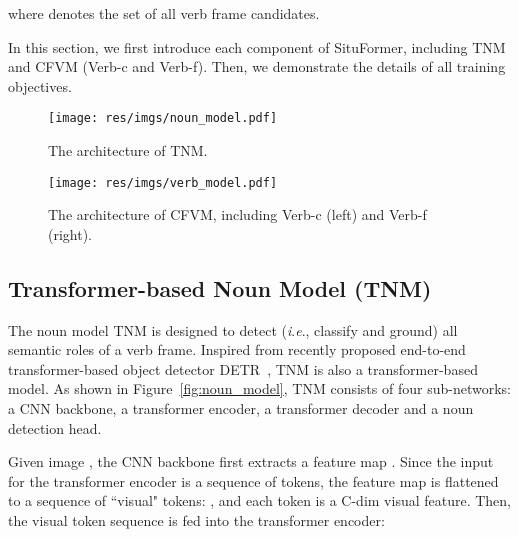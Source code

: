 \documentclass[letterpaper]{article} \usepackage{aaai22}  \usepackage{times}  \usepackage{helvet}  \usepackage{courier}  \usepackage[hyphens]{url}  \usepackage{graphicx} \urlstyle{rm} \def\UrlFont{\rm}  \usepackage{natbib}  \usepackage{caption} \DeclareCaptionStyle{ruled}{labelfont=normalfont,labelsep=colon,strut=off} \frenchspacing  \setlength{\pdfpagewidth}{8.5in}  \setlength{\pdfpageheight}{11in}
\newcommand{\ie}{\textit{i}.\textit{e}.}
\begin{document}
where  denotes the set of all verb frame candidates.

In this section, we first introduce each component of SituFormer, including TNM and CFVM (Verb-c and Verb-f). Then, we demonstrate the details of all training objectives.













\begin{figure*}
    \begin{minipage}{\textwidth}
        \begin{minipage}[t]{0.36\textwidth}
            \centering
            \texttt{[image: res/imgs/noun\_model.pdf]}
            \caption{The architecture of TNM.}
            \label{fig:noun_model}
        \end{minipage}
        \begin{minipage}[t]{0.64\textwidth}
             \centering
            \texttt{[image: res/imgs/verb\_model.pdf]}
            \caption{The architecture of CFVM, including Verb-c (left) and Verb-f (right).}
            \label{fig:verb_model}
        \end{minipage}
    \end{minipage}
\end{figure*}



\subsection{Transformer-based Noun Model (TNM)}

The noun model TNM is designed to detect (\ie, classify and ground) all semantic roles of a verb frame. Inspired from recently proposed end-to-end transformer-based object detector DETR~\cite{carion2020end}, TNM is also a transformer-based model. As shown in Figure~\ref{fig:noun_model}, TNM consists of four sub-networks: a CNN backbone, a transformer encoder, a transformer decoder and a noun detection head.

Given image , the CNN backbone first extracts a feature map . Since the input for the transformer encoder is a sequence of tokens, the feature map  is flattened to a sequence of ``visual" tokens: , and each token  is a C-dim visual feature. Then, the visual token sequence is fed into the transformer encoder:
\end{document}
